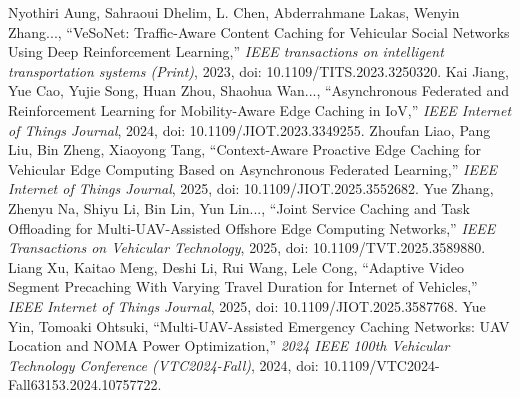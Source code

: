 Nyothiri Aung, Sahraoui Dhelim, L. Chen, Abderrahmane Lakas, Wenyin Zhang..., ``VeSoNet: Traffic-Aware Content Caching for Vehicular Social Networks Using Deep Reinforcement Learning,'' \textit{IEEE transactions on intelligent transportation systems (Print)}, 2023, doi: 10.1109/TITS.2023.3250320.
Kai Jiang, Yue Cao, Yujie Song, Huan Zhou, Shaohua Wan..., ``Asynchronous Federated and Reinforcement Learning for Mobility-Aware Edge Caching in IoV,'' \textit{IEEE Internet of Things Journal}, 2024, doi: 10.1109/JIOT.2023.3349255.
Zhoufan Liao, Pang Liu, Bin Zheng, Xiaoyong Tang, ``Context-Aware Proactive Edge Caching for Vehicular Edge Computing Based on Asynchronous Federated Learning,'' \textit{IEEE Internet of Things Journal}, 2025, doi: 10.1109/JIOT.2025.3552682.
Yue Zhang, Zhenyu Na, Shiyu Li, Bin Lin, Yun Lin..., ``Joint Service Caching and Task Offloading for Multi-UAV-Assisted Offshore Edge Computing Networks,'' \textit{IEEE Transactions on Vehicular Technology}, 2025, doi: 10.1109/TVT.2025.3589880.
Liang Xu, Kaitao Meng, Deshi Li, Rui Wang, Lele Cong, ``Adaptive Video Segment Precaching With Varying Travel Duration for Internet of Vehicles,'' \textit{IEEE Internet of Things Journal}, 2025, doi: 10.1109/JIOT.2025.3587768.
Yue Yin, Tomoaki Ohtsuki, ``Multi-UAV-Assisted Emergency Caching Networks: UAV Location and NOMA Power Optimization,'' \textit{2024 IEEE 100th Vehicular Technology Conference (VTC2024-Fall)}, 2024, doi: 10.1109/VTC2024-Fall63153.2024.10757722.

